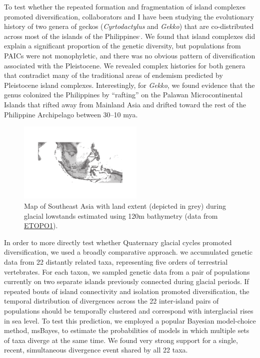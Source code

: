 \documentclass[10pt]{article}
\newcommand{\super}[1]{\ensuremath{^{\textrm{#1}}}}
\begin{document}
To test whether the repeated formation and fragmentation of island complexes
promoted diversification, collaborators and I have been studying the
evolutionary history of two genera of geckos (\emph{Cyrtodactylus} and
\emph{Gekko}) that are co-distributed across most of the islands of the
Philippines\super{,}.
We found that island complexes did explain a significant proportion of the
genetic diversity, but populations from PAICs were not monophyletic, and there
was no obvious pattern of diversification associated with the Pleistocene.
We revealed complex histories for both genera that contradict many of the
traditional areas of endemism predicted by Pleistocene island complexes.
Interestingly, for \emph{Gekko}, we found evidence that the genus colonized the
Philippines by ``rafting'' on the Palawan Microcontinental Islands that rifted
away from Mainland Asia and drifted toward the rest of the Philippine
Archipelago between 30--10 mya.

\begin{figure}
  \vspace{-1.5em}
  \begin{center}
    \includegraphics[width=0.53\textwidth]{sunda_shelf_small.pdf}
  \end{center}
  \vspace{-0.2em}
  \caption{Map of Southeast Asia with land extent (depicted in grey) during
  glacial lowstands estimated using 120m bathymetry (data from
  \href{http://ngdc.noaa.gov/mgg/global/global.html}{ETOPO1}).}
  \label{map}
  \vspace{-1.1em}
\end{figure}

In order to more directly test whether Quaternary glacial cycles promoted
diversification, we used a broadly comparative approach.
we accumulated genetic data from 22 distantly related
taxa, representing five orders of terrestrial vertebrates.
For each taxon, we sampled genetic data from a pair of populations
currently on two separate islands previously connected during glacial
periods.
If repeated bouts of island connectivity and isolation promoted
diversification, the temporal distribution of divergences across the 22
inter-island pairs of populations should be temporally clustered and correspond
with interglacial rises in sea level.
To test this prediction,
we employed a popular Bayesian model-choice method, msBayes, to estimate the
probabilities of models in which multiple sets of taxa diverge at the same time.
We found very strong support
for a single, recent, simultaneous divergence event shared by all 22 taxa.
\end{document}

